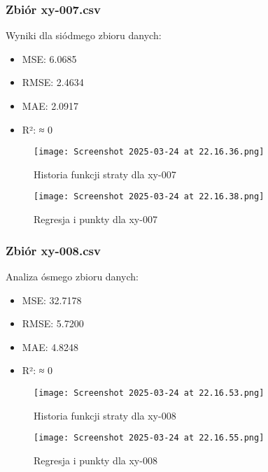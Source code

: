 \documentclass{article}
\begin{document}
\subsubsection{Zbiór xy-007.csv}
Wyniki dla siódmego zbioru danych:
\begin{itemize}
    \item MSE: 6.0685
    \item RMSE: 2.4634
    \item MAE: 2.0917
    \item R²: ≈ 0
\end{itemize}

\begin{figure}[H]
    \centering
    \begin{minipage}{0.45\textwidth}
        \texttt{[image: Screenshot 2025-03-24 at 22.16.36.png]}
        \caption{Historia funkcji straty dla xy-007}
    \end{minipage}
    \hfill
    \begin{minipage}{0.45\textwidth}
        \texttt{[image: Screenshot 2025-03-24 at 22.16.38.png]}
        \caption{Regresja i punkty dla xy-007}
    \end{minipage}
\end{figure}

\subsubsection{Zbiór xy-008.csv}
Analiza ósmego zbioru danych:
\begin{itemize}
    \item MSE: 32.7178
    \item RMSE: 5.7200
    \item MAE: 4.8248
    \item R²: ≈ 0
\end{itemize}

\begin{figure}[H]
    \centering
    \begin{minipage}{0.45\textwidth}
        \texttt{[image: Screenshot 2025-03-24 at 22.16.53.png]}
        \caption{Historia funkcji straty dla xy-008}
    \end{minipage}
    \hfill
    \begin{minipage}{0.45\textwidth}
        \texttt{[image: Screenshot 2025-03-24 at 22.16.55.png]}
        \caption{Regresja i punkty dla xy-008}
    \end{minipage}
\end{figure}
\end{document}
